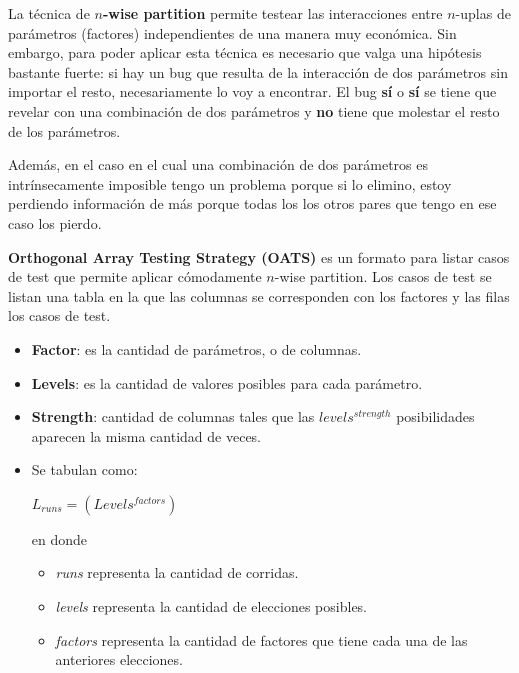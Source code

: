 \documentclass[]{article}
\begin{document}

La técnica de \textbf{$n$-wise partition} permite testear las interacciones entre $n$-uplas de parámetros (factores) independientes de una manera muy económica. Sin embargo, para poder aplicar esta técnica es necesario que valga una hipótesis bastante fuerte: si hay un bug que resulta de la interacción de dos parámetros sin importar el resto, necesariamente lo voy a encontrar. El bug \textbf{sí} o \textbf{sí} se tiene que revelar con una combinación de dos parámetros y \textbf{no} tiene que molestar el resto de los parámetros.

Además, en el caso en el cual una combinación de dos parámetros es intrínsecamente imposible tengo un problema porque si lo elimino, estoy perdiendo información de más porque todas los los otros pares que tengo en ese caso los pierdo.

\textbf{Orthogonal Array Testing Strategy (OATS)} es un formato para listar casos de test que permite aplicar cómodamente $n$-wise partition. Los casos de test se listan una tabla en la que las columnas se corresponden con los factores y las filas los casos de test.

\begin{itemize}
	\item \textbf{Factor}: es la cantidad de parámetros, o de columnas.
	\item \textbf{Levels}: es la cantidad de valores posibles para cada parámetro.
	\item \textbf{Strength}: cantidad de columnas tales que las $levels^{strength}$ posibilidades aparecen la misma cantidad de veces.
	\item Se tabulan como:
	\begin{center}
		$L_{runs} = (Levels^{factors})$
	\end{center}
	en donde
	\begin{itemize}
		\item \textit{runs} representa la cantidad de corridas.
		\item \textit{levels} representa la cantidad de elecciones posibles.
		\item \textit{factors} representa la cantidad de factores que tiene cada una de las anteriores elecciones.
	\end{itemize}
\end{itemize}

~\newline
\end{document}
